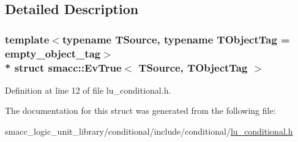 \subsection{Detailed Description}
\subsubsection*{template$<$typename T\+Source, typename T\+Object\+Tag = empty\+\_\+object\+\_\+tag$>$\\*
struct smacc\+::\+Ev\+True$<$ T\+Source, T\+Object\+Tag $>$}



Definition at line 12 of file lu\+\_\+conditional.\+h.



The documentation for this struct was generated from the following file\+:\begin{DoxyCompactItemize}
\item 
smacc\+\_\+logic\+\_\+unit\+\_\+library/conditional/include/conditional/\hyperlink{lu__conditional_8h}{lu\+\_\+conditional.\+h}\end{DoxyCompactItemize}
